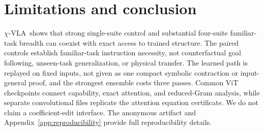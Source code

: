 \documentclass{article}
\newcommand{\chivla}{$\chi$-VLA}
\begin{document}
\section{Limitations and conclusion}

\chivla\ shows that strong single-suite control and substantial four-suite familiar-task breadth
can coexist with exact access to trained structure.
The paired controls establish familiar-task instruction necessity, not counterfactual goal following,
unseen-task generalization, or physical transfer. The learned path is replayed on fixed inputs, not given
as one compact symbolic contraction or input-general proof, and the strongest ensemble costs three
passes. Common ViT checkpoints connect capability, exact attention, and reduced-Gram analysis,
while separate convolutional files replicate the attention equation certificate. We do not claim a
coefficient-edit interface. The anonymous artifact and Appendix~\ref{app:reproducibility} provide
full reproducibility details.
\end{document}
